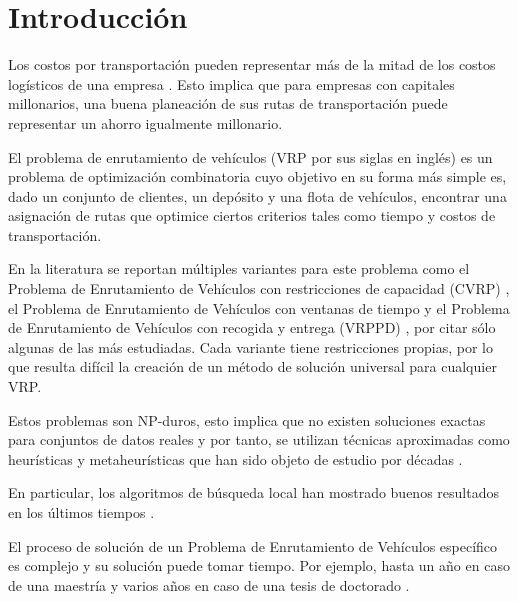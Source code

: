 \chapter*{Introducción}\label{chapter:introduction}

\qquad 
Los costos por transportación pueden representar más de la mitad de los costos logísticos de una empresa \cite{factoid}. Esto implica que para empresas con capitales millonarios, una buena planeación de sus rutas de transportación puede representar un ahorro igualmente millonario.

El problema de enrutamiento de vehículos (VRP por sus siglas en inglés) es un problema de optimización combinatoria cuyo objetivo en su forma más simple es, dado un conjunto de clientes, un depósito y una flota de vehículos, encontrar una asignación de rutas que optimice ciertos criterios tales como tiempo y costos de transportación.

En la literatura se reportan múltiples variantes para este problema como el Problema de Enrutamiento de Vehículos con restricciones de capacidad (CVRP) \cite{CVRP}, el Problema de Enrutamiento de Vehículos con ventanas de tiempo \cite{VRPTW} y el Problema de Enrutamiento de Vehículos con recogida y entrega (VRPPD) \cite{2002vehicle}, por citar sólo algunas de las más estudiadas. Cada variante tiene restricciones propias, por lo que resulta difícil la creación de un método de solución universal para cualquier VRP.

Estos problemas son NP-duros, esto implica que no existen soluciones exactas para conjuntos de datos reales y por tanto, se utilizan técnicas aproximadas como heurísticas y metaheurísticas que han sido objeto de estudio por décadas \cite{1964scheduling,1974networks,1981complexity,1997tabu,2002vehicle}.

En particular, los algoritmos de búsqueda local han mostrado buenos resultados en los últimos tiempos \cite{ALNS-2007,Osman-1996,Vns-Component-2013}.

El proceso de solución de un Problema de Enrutamiento de Vehículos específico es complejo y su solución puede tomar tiempo. Por ejemplo, hasta un año en caso de una maestría \cite{Alina2010} y varios años en caso de una tesis de doctorado \cite{Alina2017}.

